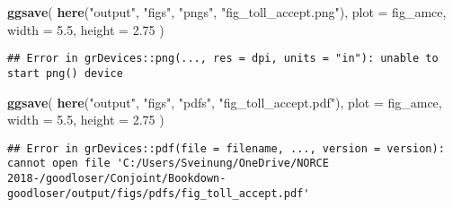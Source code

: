 \documentclass[]{book}
\newenvironment{Shaded}{\begin{snugshade}}{\end{snugshade}}
\newcommand{\KeywordTok}[1]{\textcolor[rgb]{0.13,0.29,0.53}{\textbf{#1}}}
\newcommand{\DataTypeTok}[1]{\textcolor[rgb]{0.13,0.29,0.53}{#1}}
\newcommand{\FloatTok}[1]{\textcolor[rgb]{0.00,0.00,0.81}{#1}}
\newcommand{\StringTok}[1]{\textcolor[rgb]{0.31,0.60,0.02}{#1}}
\newcommand{\NormalTok}[1]{#1}
\begin{document}
\begin{Shaded}
\begin{Highlighting}[]
\KeywordTok{ggsave}\NormalTok{(}
  \KeywordTok{here}\NormalTok{(}\StringTok{"output"}\NormalTok{, }\StringTok{"figs"}\NormalTok{, }\StringTok{"pngs"}\NormalTok{, }\StringTok{"fig_toll_accept.png"}\NormalTok{),}
  \DataTypeTok{plot =}\NormalTok{ fig_amce,}
  \DataTypeTok{width =} \FloatTok{5.5}\NormalTok{, }\DataTypeTok{height =} \FloatTok{2.75}
\NormalTok{)}
\end{Highlighting}
\end{Shaded}

\begin{verbatim}
## Error in grDevices::png(..., res = dpi, units = "in"): unable to start png() device
\end{verbatim}

\begin{Shaded}
\begin{Highlighting}[]
\KeywordTok{ggsave}\NormalTok{(}
  \KeywordTok{here}\NormalTok{(}\StringTok{"output"}\NormalTok{, }\StringTok{"figs"}\NormalTok{, }\StringTok{"pdfs"}\NormalTok{, }\StringTok{"fig_toll_accept.pdf"}\NormalTok{),}
  \DataTypeTok{plot =}\NormalTok{ fig_amce,}
  \DataTypeTok{width =} \FloatTok{5.5}\NormalTok{, }\DataTypeTok{height =} \FloatTok{2.75}
\NormalTok{)}
\end{Highlighting}
\end{Shaded}

\begin{verbatim}
## Error in grDevices::pdf(file = filename, ..., version = version): cannot open file 'C:/Users/Sveinung/OneDrive/NORCE 2018-/goodloser/Conjoint/Bookdown-goodloser/output/figs/pdfs/fig_toll_accept.pdf'
\end{verbatim}
\end{document}
